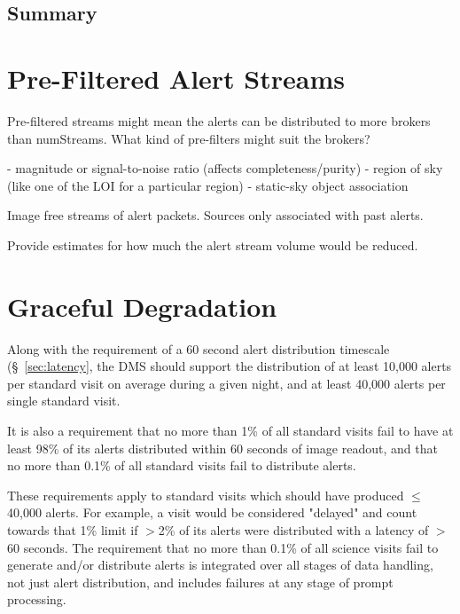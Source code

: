 \documentclass[DM,lsstdraft,authoryear,toc]{lsstdoc}
\begin{document}
\subsection{Summary}\label{ssec:latency_summary}




\clearpage
\section{Pre-Filtered Alert Streams} \label{sec:prefilter}

Pre-filtered streams might mean the alerts can be distributed to more brokers than numStreams. What kind of pre-filters might suit the brokers?

 - magnitude or signal-to-noise ratio (affects completeness/purity)
 - region of sky (like one of the LOI for a particular region)
 - static-sky object association
 
 Image free streams of alert packets.
 Sources only associated with past alerts.

Provide estimates for how much the alert stream volume would be reduced.



\clearpage
\section{Graceful Degradation} \label{sec:graceful}

Along with the requirement of a 60 second alert distribution timescale (\S~\ref{sec:latency}, the DMS should support the distribution of at least 10,000 alerts per standard visit on average during a given night, and at least 40,000 alerts per single standard visit. 

It is also a requirement that no more than 1\% of all standard visits fail to have at least 98\% of its alerts distributed within 60 seconds of image readout, and that no more than 0.1\% of all standard visits fail to distribute alerts.

These requirements apply to standard visits which should have produced $\leq$40,000 alerts. For example, a visit would be considered "delayed" and count towards that 1\% limit if $>$2\% of its alerts were distributed with a latency of $>$60 seconds. The requirement that no more than 0.1\% of all science visits fail to generate and/or distribute alerts is integrated over all stages of data handling, not just alert distribution, and includes failures at any stage of prompt processing.
\end{document}
